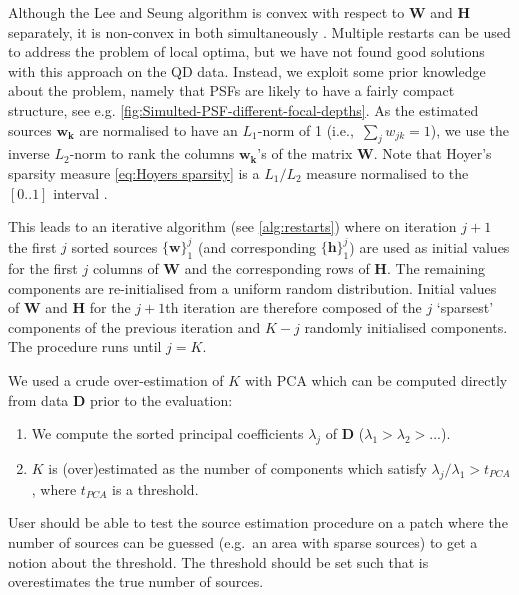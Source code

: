 Although the Lee and Seung algorithm is convex with respect to $\bm{W}$ and $\bm{H}$ separately, it is non-convex in both simultaneously \cite{Lee2001}. Multiple restarts can be used to address the problem of local optima, but we have not found good solutions with this approach on the QD data. Instead, we exploit some prior knowledge about the problem, namely that PSFs are likely to have a fairly compact structure, see e.g. \autoref{fig:Simulted-PSF-different-focal-depths}. As the estimated sources $\bm{w_{k}}$ are normalised to have an $L_1$-norm of 1 (i.e.,\ $\sum_{j}w_{jk}=1$), we use the inverse $L_2$-norm to rank the columns $\bm{w_{k}}$'s of the matrix $\bm{W}$. Note that Hoyer's sparsity measure \autoref{eq:Hoyers sparsity} is a $L_{1}/L_{2}$ measure normalised to the $[0..1]$ interval \cite{Kim2008}. 

This leads to an iterative algorithm (see \autoref{alg:restarts}) where on iteration $j+1$ the first $j$ sorted sources $\{ \bm{w} \}_{1}^{j}$ (and corresponding $\{ \bm{h} \}_{1}^{j}$) are used as initial values for the first $j$ columns of $\bm{W}$ and the corresponding rows of $\bm{H}$. The remaining components are re-initialised from a uniform random distribution. Initial values of $\bm{W}$ and $\bm{H}$ for the $j+1$th iteration are therefore composed of the $j$ `sparsest' components of the previous iteration and $K-j$ randomly initialised components. The procedure runs until $j=K$. 

We used a crude over-estimation of $K$ with PCA which can be computed directly from data $\bm{D}$ prior to the evaluation: 
%
\begin{enumerate}
	\item
	We compute the sorted principal coefficients $\lambda_{j}$ of $\bm{D}$ ($\lambda_{1}>\lambda_{2}>...$). 
	\item
	$K$ is (over)estimated as the number of components which satisfy $\lambda_{j}/\lambda_{1}>t_{\unit{PCA}}$, where $t_{\unit{PCA}}$ is a threshold. 
\end{enumerate}
%
User should be able to test the source estimation procedure on a patch where the number of sources can be guessed (e.g.\ an area with sparse sources) to get a notion about the threshold. The threshold should be set such that is overestimates the true number of sources.

